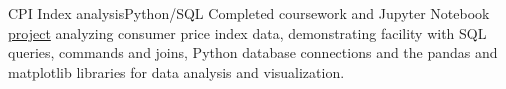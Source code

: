 {CPI Index analysis}{Python/SQL}
{Completed coursework and Jupyter Notebook \href{https://github.com/jacobarchambault/cpi-python}{project} analyzing consumer price index data, demonstrating facility with SQL queries, commands and joins, 
	Python database connections and the pandas and matplotlib libraries for data analysis and visualization.}
